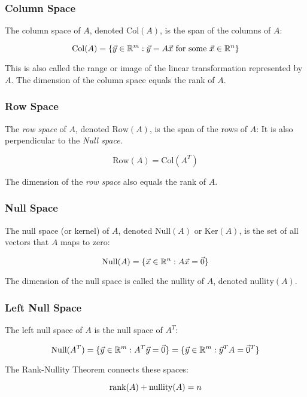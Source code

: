\subsubsection{Column Space}

The column space of \(A\), denoted \(\text{Col}(A)\), is the span of the columns of \(A\):

\[
    \text{Col}(A) = \{\vec{y} \in \mathbb{R}^m : \vec{y} = A\vec{x} \text{ for some } \vec{x} \in \mathbb{R}^n\}
\]

This is also called the range or image of the linear transformation represented by \(A\). The dimension of the column space equals the rank of \(A\).

\subsubsection{Row Space}

The \emph{row space} of \(A\), denoted \(\text{Row}(A)\), is the span of the rows of \(A\):
 It is also perpendicular to the \emph{Null space}.

\[
    \text{Row}(A) = \text{Col}(A^T)
\]

The dimension of the \emph{row space} also equals the rank of \(A\).

\subsubsection{Null Space}

The null space (or kernel) of \(A\), denoted \(\text{Null}(A)\) or \(\text{Ker}(A)\), 
is the set of all vectors that \(A\) maps to zero:

\[
    \text{Null}(A) = \{\vec{x} \in \mathbb{R}^n : A\vec{x} = \vec{0}\}
\]

The dimension of the null space is called the nullity of \(A\), denoted \(\text{nullity}(A)\).

\subsubsection{Left Null Space}

The left null space of \(A\) is the null space of \(A^T\):

\[
    \text{Null}(A^T) = \{\vec{y} \in \mathbb{R}^m : A^T\vec{y} = \vec{0}\} = \{\vec{y} \in \mathbb{R}^m : \vec{y}^T A = \vec{0}^T\}
\]

The Rank-Nullity Theorem connects these spaces:

\[
    \text{rank}(A) + \text{nullity}(A) = n
\]

